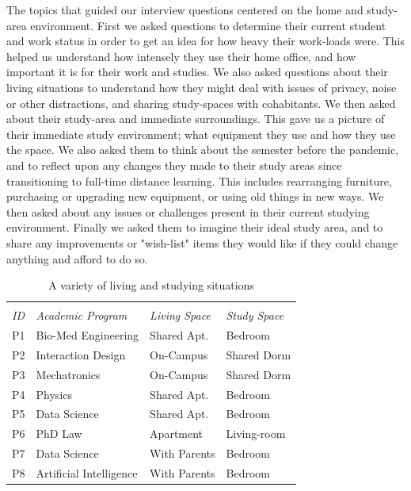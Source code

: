 \documentclass{sigchi}
\begin{document}
The topics that guided our interview questions centered on the home and study-area environment. First we asked questions to determine their current student and work status in order to get an idea for how heavy their work-loads were. This helped us understand how intensely they use their home office, and how important it is for their work and studies. We also asked questions about their living situations to understand how they might deal with issues of privacy, noise or other distractions, and sharing study-spaces with cohabitants. We then asked about their study-area and immediate surroundings. This gave us a picture of their immediate study environment; what equipment they use and how they use the space. We also asked them to think about the semester before the pandemic, and to reflect upon any changes they made to their study areas since transitioning to full-time distance learning. This includes rearranging furniture, purchasing or upgrading new equipment, or using old things in new ways. We then asked about any issues or challenges present in their current studying environment. Finally we asked them to imagine their ideal study area, and to share any improvements or "wish-list" items they would like if they could change anything and afford to do so. 
\begin{table}
  \centering
  \begin{tabular}{l l l l}
    & & \multicolumn{2}{c}{\small} \\
    \cmidrule(r){1-4}
    {\small\textit{ID}}
    & {\small \textit{Academic Program}}
      & {\small \textit{Living Space}}
    & {\small \textit{Study Space}} \\
    \midrule
    P1 & Bio-Med Engineering & Shared Apt. & Bedroom \\
    P2 & Interaction Design & On-Campus & Shared Dorm \\
    P3 & Mechatronics & On-Campus & Shared Dorm \\
    P4 & Physics & Shared Apt. & Bedroom \\
    P5 & Data Science & Shared Apt. & Bedroom \\
    P6 & PhD Law & Apartment & Living-room \\
    P7 & Data Science & With Parents & Bedroom \\
    P8 & Artificial Intelligence & With Parents & Bedroom \\
  \end{tabular}
  \caption{A variety of living and studying situations}~\label{tab:table1}
\end{table}
\end{document}
